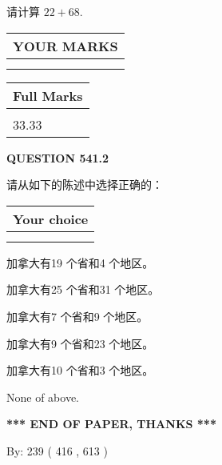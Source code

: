 \documentclass{ctexart}
\begin{document}
  
 
请计算 $ %
22 +  %
68 $.
 

 

 
  
\vspace{0.2in}
  
\noindent\begin{tabular}{|l|}
\hline
 YOUR MARKS  \\
\hline
 \\ 
 \\ 
\hline
\end{tabular}
\hspace{0.05in} \begin{tabular}{|l|}
\hline
 Full Marks  \\
\hline
 \\ 
33.33 \\
\hline
\end{tabular}
{\textbf{\Large{QUESTION
541.2 
}}}
  
  
请从如下的陈述中选择正确的：
  
  
\noindent\hspace{3.0in} \begin{tabular}{|l|}
\hline
Your choice \\
\hline
 \\ 
 \\ 
\hline
\end{tabular}
  
  
 
 
加拿大有19 个省和4 个地区。
 
 
加拿大有25 个省和31 个地区。
 
 
加拿大有7 个省和9 个地区。
 
 
加拿大有9 个省和23 个地区。
 
 
加拿大有10 个省和3 个地区。
 
 
 None of above.
 
 
   
   
 \vspace{0.2in}
 
   
   
   
   
\vspace{1.0in} 
{\textbf{\large{ *** END OF PAPER, THANKS *** }}} 
   
   
\hspace{1.0in} By: 
 239 ( 416 ,  613 )
   
\end{document}
